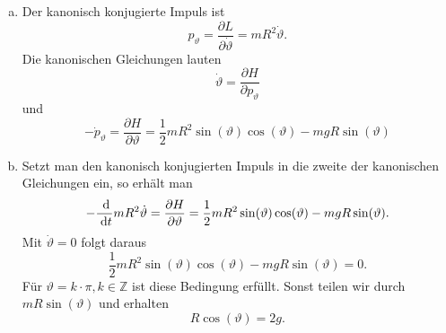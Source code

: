 \documentclass{article}
\theoremstyle{definition}
\newcommand{\Z}{\mathbb{Z}}
\renewcommand{\theta}{\vartheta}
\begin{document}
\begin{enumerate}[(a)]
    \item Der kanonisch konjugierte Impuls ist 
    $$p_\theta = \frac{\partial L }{\partial \dot \theta} = mR^2 \dot \theta.$$ Die kanonischen Gleichungen lauten
    $$\dot \theta = \frac{\partial H}{\partial p_\theta}$$ und $$-\dot p_\theta = \frac{\partial H}{\partial \theta} = \frac{1}{2}mR^2\sin(\theta)\cos(\theta) - mgR \sin(\theta)$$
    \item Setzt man den kanonisch konjugierten Impuls in die zweite der kanonischen Gleichungen ein, so erhält man
    $$- \frac{\d}{\d t}mR^2 \dot \theta = \frac{\partial H}{\partial \theta} = \frac{1}{2}mR^2\sin(\theta)\cos(\theta) - mgR \sin(\theta).$$ Mit $\dot \theta = 0$ folgt daraus
    $$\frac{1}{2}mR^2\sin(\theta)\cos(\theta) - mgR \sin(\theta) = 0.$$
    Für $\theta = k\cdot \pi, k \in \Z$ ist diese Bedingung erfüllt. Sonst teilen wir durch $mR\sin(\theta)$ und erhalten
    $$R\cos(\theta) = 2g.$$
\end{enumerate}
\end{document}
